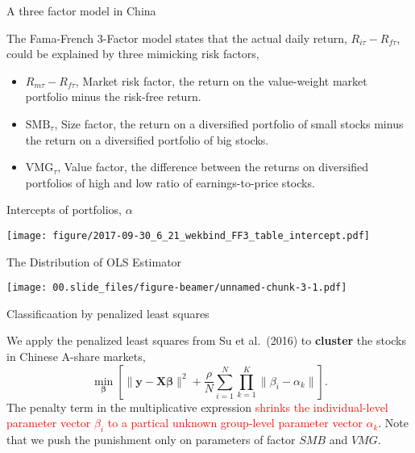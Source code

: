 \documentclass[
11pt,
ignorenonframetext,
]{beamer}
\begin{document}
\begin{frame}{A three factor model in China}
\protect\hypertarget{a-three-factor-model-in-china}{}

The Fama-French 3-Factor model states that the actual daily return,
\(R_{i\tau}-R_{f\tau}\), could be explained by three mimicking risk
factors,

\begin{itemize}
\item
  \(R_{m\tau} - R_{f\tau}\), Market risk factor, the return on the
  value-weight market portfolio minus the risk-free return.
\item
  \(\text{SMB}_\tau\), Size factor, the return on a diversified
  portfolio of small stocks minus the return on a diversified portfolio
  of big stocks.
\item
  \(\text{VMG}_\tau\), Value factor, the difference between the returns
  on diversified portfolios of high and low ratio of earnings-to-price
  stocks.
\end{itemize}

\end{frame}

\begin{frame}{Intercepts of portfolios, \(\alpha\)}
\protect\hypertarget{intercepts-of-portfolios-alpha}{}

\texttt{[image: figure/2017-09-30\_6\_21\_wekbind\_FF3\_table\_intercept.pdf]}

\end{frame}

\begin{frame}{The Distribution of OLS Estimator}
\protect\hypertarget{the-distribution-of-ols-estimator}{}

\texttt{[image: 00.slide\_files/figure-beamer/unnamed-chunk-3-1.pdf]}

\end{frame}

\begin{frame}{Classificaation by penalized least squares}
\protect\hypertarget{classificaation-by-penalized-least-squares}{}

We apply the penalized least squares from Su et al.~(2016) to
\textbf{cluster} the stocks in Chinese A-share markets, \begin{equation}
\min_{\boldsymbol \beta} \left[ \|\mathbf{y}-\mathbf{X} \boldsymbol{\beta}\|^{2} +
\frac{\rho}{N} \sum_{i=1}^N \textstyle\prod_{k=1}^{K}
\parallel \! \beta_{i} -  \alpha_{k} \! \parallel \right].
\end{equation} The penalty term in the multiplicative expression
\textcolor{red}{shrinks the individual-level parameter vector $\beta_{i}$
to a partical unknown group-level parameter vector $\alpha_{k}$}. Note
that we push the punishment only on parameters of factor \(SMB\) and
\(VMG\).

\end{frame}
\end{document}
